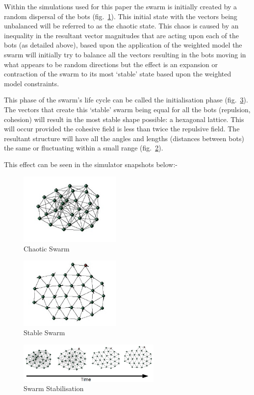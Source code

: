 \documentclass[10pt,journal,letterpaper,twoside]{IEEEtran}
\newcommand{\Fig}{fig.}
\begin{document}
Within the simulations used for this paper the swarm is initially
created by a random dispersal of the bots
(\Fig{}~\ref{methods:Chaos1}). This initial state with the vectors
being unbalanced will be referred to as the chaotic state. This chaos
is caused by an inequality in the resultant vector magnitudes that are
acting upon each of the bots (as detailed above), based upon the
application of the weighted model the swarm will initially try to
balance all the vectors resulting in the bots moving in what appears
to be random directions but the effect is an expansion or contraction
of the swarm to its most `stable' state based upon the weighted model
constraints.

This phase of the swarm's life cycle can be called the initialisation
phase (\Fig{}~\ref{methods:StableTime1}). The vectors that create this
`stable' swarm being equal for all the bots (repulsion, cohesion) will
result in the most stable shape possible: a hexagonal lattice. This
will occur provided the cohesive field is less than twice the
repulsive field. The resultant structure will have all the angles and
lengths (distances between bots) the same or fluctuating within a
small range (\Fig{}~\ref{methods:Stable1}).

This effect can be seen in the simulator snapshots below:-

\begin{figure}[H]
\begin{center}
\includegraphics[width=5cm]{figures/Chaos}
\end{center}
\caption{Chaotic Swarm\label{methods:Chaos1}}
\end{figure}
\begin{figure}[H]
\begin{center}
\includegraphics[width=5cm]{figures/Stable}
\end{center}
\caption{Stable Swarm\label{methods:Stable1}}
\end{figure}
\begin{figure}[H]
\begin{center}
\includegraphics[width=7cm]{figures/StableTime}
\end{center}
\caption{Swarm Stabilisation\label{methods:StableTime1}}
\end{figure}
\end{document}
